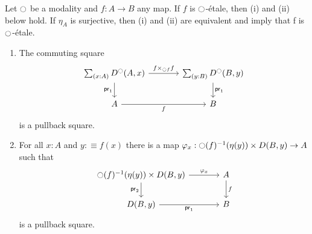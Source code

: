 \documentclass[9pt,twosided]{amsart}
\begin{document}
\begin{lem}\label{lem:etale_char}
  Let ${\ocircle}$ be a modality and $f:A\to B$ any map.
  If $f$ is ${\ocircle}$-\'etale, then (i) and (ii) below hold.
  If $\eta_A$ is surjective, then (i) and (ii) are equivalent and imply that f is ${\ocircle}$-étale.
\begin{enumerate}
\item The commuting square
\begin{equation*}
\begin{tikzcd}[column sep=large]
\sm{x:A}D^\modal(A,x) \arrow[d,swap,"\proj 1"] \arrow[r,"{f\times_{\modal f} f}"] & \sm{y:B}D^\modal(B,y) \arrow[d,"\proj 1"] \\
A \arrow[r,swap,"f"] & B
\end{tikzcd}
\end{equation*}
is a pullback square.
\item For all $x:A$ and $y:\equiv f(x)$ there is a map $\varphi_x:{\ocircle}(f)^{-1}(\eta(y))\times D(B,y)\to A$ such that
  \begin{equation*}
    \begin{tikzcd}[column sep=large]
      \modal(f)^{-1}(\eta(y))\arrow[r,"\varphi_x"]\arrow[d,swap,"\proj 2"]\times D(B,y)   &  A\arrow[d,"f"] \\
      D(B,y)\arrow[r,"\proj 1",swap]  & B
    \end{tikzcd}
  \end{equation*}
is a pullback square.
\end{enumerate}
\end{lem}
\end{document}
